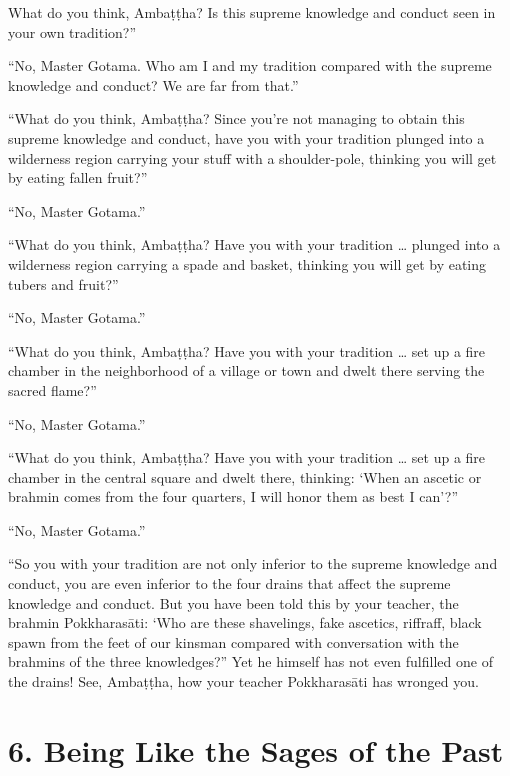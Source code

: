 \documentclass[12pt,openany]{book}%
\begin{document}
What do you think, \textsanskrit{Ambaṭṭha}? Is this supreme knowledge and conduct seen in your own tradition?” 

“No, Master Gotama. Who am I and my tradition compared with the supreme knowledge and conduct? We are far from that.” 

“What do you think, \textsanskrit{Ambaṭṭha}? Since you’re not managing to obtain this supreme knowledge and conduct, have you with your tradition plunged into a wilderness region carrying your stuff with a shoulder-pole, thinking you will get by eating fallen fruit?” 

“No, Master Gotama.” 

“What do you think, \textsanskrit{Ambaṭṭha}? Have you with your tradition … plunged into a wilderness region carrying a spade and basket, thinking you will get by eating tubers and fruit?” 

“No, Master Gotama.” 

“What do you think, \textsanskrit{Ambaṭṭha}? Have you with your tradition … set up a fire chamber in the neighborhood of a village or town and dwelt there serving the sacred flame?” 

“No, Master Gotama.” 

“What do you think, \textsanskrit{Ambaṭṭha}? Have you with your tradition … set up a fire chamber in the central square and dwelt there, thinking: ‘When an ascetic or brahmin comes from the four quarters, I will honor them as best I can’?” 

“No, Master Gotama.” 

“So you with your tradition are not only inferior to the supreme knowledge and conduct, you are even inferior to the four drains that affect the supreme knowledge and conduct. But you have been told this by your teacher, the brahmin \textsanskrit{Pokkharasāti}: ‘Who are these shavelings, fake ascetics, riffraff, black spawn from the feet of our kinsman compared with conversation with the brahmins of the three knowledges?” Yet he himself has not even fulfilled one of the drains! See, \textsanskrit{Ambaṭṭha}, how your teacher \textsanskrit{Pokkharasāti} has wronged you. 

\section*{6. Being Like the Sages of the Past }
\end{document}
